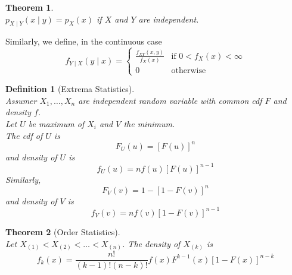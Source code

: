 \documentclass[12pt]{article}
\newtheorem{definition}{Definition}[section]
\newtheorem{theorem}{Theorem}[section]
\theoremstyle{definition}
\begin{document}
\begin{theorem}
\hfill\\\normalfont $p_{X\mid Y}(x\mid y) = p_X(x)$ if $X$ and $Y$ are independent.
\end{theorem}
Similarly, we define, in the continuous case
\[
f_{Y\mid X}(y\mid x) = \begin{cases}
\frac{f_{XY}(x,y)}{f_X(x)} & \text{if } 0<f_X(x)<\infty\\
0 & \text{otherwise}
\end{cases}
\]
\begin{definition}[Extrema Statistics]
\hfill\\\normalfont Assumer $X_1, \ldots, X_n$ are independent random variable with common cdf $F$ and density $f$.\\
Let $U$ be maximum of $X_i$ and $V$ the minimum.\\
The cdf of $U$ is 
\[
F_U(u) = [F(u)]^n
\]
and density of $U$ is
\[
f_U(u) = nf(u)[F(u)]^{n-1}
\]
Similarly,
\[
F_V(v) = 1-[1-F(v)]^n
\]
and density of $V$ is
\[
f_V(v) = nf(v)[1-F(v)]^{n-1}
\]
\end{definition}
\begin{theorem}[Order Statistics]
\hfill\\\normalfont Let $X_{(1)}<X_{(2)}<\ldots<X_{(n)}$. The density of $X_{(k)}$ is
\[
f_k(x) = \frac{n!}{(k-1)!(n-k)!} f(x) F^{k-1}(x)[1-F(x)]^{n-k}
\]
\end{theorem}
\end{document}
